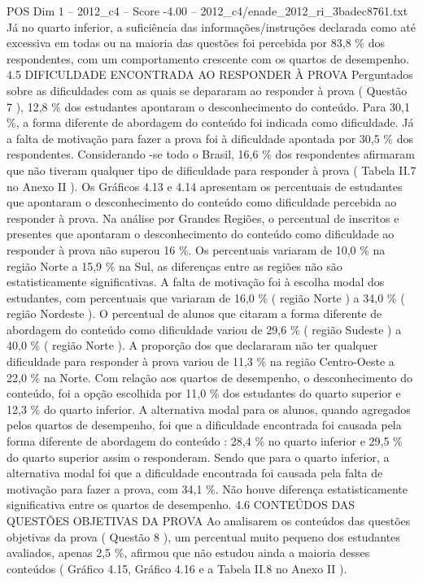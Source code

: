 \begin{textsample}{POS Dim 1 – 2012\_c4 – Score -4.00 – 2012\_c4/enade\_2012\_ri\_3badec8761.txt}
Já no quarto inferior, a suficiência das informações/instruções declarada como até excessiva em todas ou na maioria das questões foi percebida por 83,8 \% dos respondentes, com um comportamento crescente com os quartos de desempenho. 4.5 DIFICULDADE ENCONTRADA AO RESPONDER À PROVA Perguntados sobre as dificuldades com as quais se depararam ao responder à prova ( Questão 7 ), 12,8 \% dos estudantes apontaram o desconhecimento do conteúdo.
Para 30,1 \%, a forma diferente de abordagem do conteúdo foi indicada como dificuldade.
Já a falta de motivação para fazer a prova foi à dificuldade apontada por 30,5 \% dos respondentes.
Considerando -se todo o Brasil, 16,6 \% dos respondentes afirmaram que não tiveram qualquer tipo de dificuldade para responder à prova ( Tabela II.7 no Anexo II ).
Os Gráficos 4.13 e 4.14 apresentam os percentuais de estudantes que apontaram o desconhecimento do conteúdo como dificuldade percebida ao responder à prova.
Na análise por Grandes Regiões, o percentual de inscritos e presentes que apontaram o desconhecimento do conteúdo como dificuldade ao responder à prova não superou 16 \%.
Os percentuais variaram de 10,0 \% na região Norte a 15,9 \% na Sul, as diferenças entre as regiões não são estatisticamente significativas.
A falta de motivação foi à escolha modal dos estudantes, com percentuais que variaram de 16,0 \% ( região Norte ) a 34,0 \% ( região Nordeste ).
O percentual de alunos que citaram a forma diferente de abordagem do conteúdo como dificuldade variou de 29,6 \% ( região Sudeste ) a 40,0 \% ( região Norte ).
A proporção dos que declararam não ter qualquer dificuldade para responder à prova variou de 11,3 \% na região Centro-Oeste a 22,0 \% na Norte.
Com relação aos quartos de desempenho, o desconhecimento do conteúdo, foi a opção escolhida por 11,0 \% dos estudantes do quarto superior e 12,3 \% do quarto inferior.
A alternativa modal para os alunos, quando agregados pelos quartos de desempenho, foi que a dificuldade encontrada foi causada pela forma diferente de abordagem do conteúdo : 28,4 \% no quarto inferior e 29,5 \% do quarto superior assim o responderam.
Sendo que para o quarto inferior, a alternativa modal foi que a dificuldade encontrada foi causada pela falta de motivação para fazer a prova, com 34,1 \%.
Não houve diferença estatisticamente significativa entre os quartos de desempenho. 4.6 CONTEÚDOS DAS QUESTÕES OBJETIVAS DA PROVA Ao analisarem os conteúdos das questões objetivas da prova ( Questão 8 ), um percentual muito pequeno dos estudantes avaliados, apenas 2,5 \%, afirmou que não estudou ainda a maioria desses conteúdos ( Gráfico 4.15, Gráfico 4.16 e a Tabela II.8 no Anexo II ).

\end{textsample}
